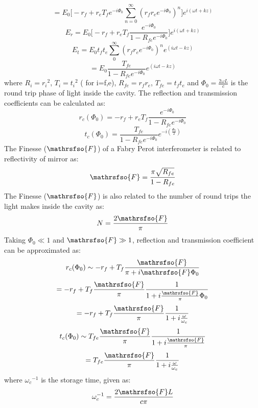 \documentclass[conference]{IEEEtran}
\begin{document}
\begin{equation*}
=E_0\bigg[-r_f+r_eT_fe^{-i\Phi_0}\sum_{n=0}^{\infty} (r_fr_e e^{-i\Phi_0})^n\bigg]e^{i(\omega t+kz)}
\end{equation*}
\begin{equation}
E_r=E_0\bigg[-r_f+r_eT_f\frac{e^{-i\Phi_0}}{1-R_{fe}e^{-i\Phi_0}}\bigg]e^{i(\omega t+kz)} 
\end{equation}
\begin{equation*}
E_t=E_0t_ft_e\sum_{0}^{\infty}(r_fr_e e^{-i\Phi_0})^n e^{(i\omega t-kz)}    
\end{equation*}
\begin{equation}
=E_0\frac{T_{fe}}{1-R_{fe} e^{-i\Phi_0}}e^{(i\omega t-kz)}    
\end{equation}
where $R_i=r{_i}^2$, $T_i=t{_i}^2$ ( for i=f,e), $R_{fe}=r_f r_e$, $T_{fe}=t_f t_e$ and $\Phi_0 = \frac{2\omega L}{c}$ is the round trip phase of light inside the cavity. The reflection and transmission coefficients can be calculated as:
\begin{equation}
r_c(\Phi_0)=-r_f + r_eT_f\frac{e^{-i\Phi_0}}{1-R_{fe}e^{-i\Phi_0}}    
\end{equation}
\begin{equation}
t_c(\Phi_0)=\frac{T_{fe}}{1-R_{fe}e^{-i\Phi_0}}e^{-i(\frac{\Phi_0}{2})} \end{equation}
The Finesse ($\mathrsfso{F}$) of a Fabry Perot interferometer is related to reflectivity of mirror as:
\begin{equation}
\mathrsfso{F} = \frac{\pi\sqrt{R_{fe}}}{1-R_{fe}}
\end{equation}
The Finesse ($\mathrsfso{F}$) is also related to the number of round trips the light makes inside the cavity as:
\begin{equation}
N=\frac{2\mathrsfso{F}}{\pi}    
\end{equation}
Taking $\Phi_0 \ll 1$ and $\mathrsfso{F} \gg 1$, reflection and transmission coefficient can be approximated as:
\begin{equation*}
r_c(\Phi_0)\sim -r_f+T_f\frac{\mathrsfso{F}}{\pi + i\mathrsfso{F}\Phi_0}    
\end{equation*}
\begin{equation*}
= -r_f+T_f\frac{\mathrsfso{F}}{\pi}\frac{1}{1 + i\frac{\mathrsfso{F}}{\pi}\Phi_0}    
\end{equation*}
\begin{equation}
= -r_f+T_f\frac{\mathrsfso{F}}{\pi}\frac{1}{1 + i\frac{\omega}{\omega_c}}    
\end{equation}
\begin{equation*}
t_c(\Phi_0)\sim T_{fe}\frac{\mathrsfso{F}}{\pi}\frac{1}{1 + i\frac{\mathrsfso{F}}{\pi}}    
\end{equation*}
\begin{equation}
=T_{fe}\frac{\mathrsfso{F}}{\pi}\frac{1}{1 + i\frac{\omega}{\omega_c}}    
\end{equation}
where ${\omega_c}^{-1}$ is the storage time, given as:
\begin{equation}
 \omega_c^{-1}=\frac{2\mathrsfso{F}L}{c\pi}  
\end{equation}
\end{document}
